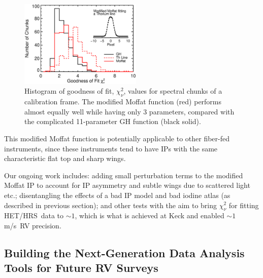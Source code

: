 \documentclass[12pt]{article}
\def\mps{m/s}
\def\hrs{HET/HRS}
\begin{document}
\begin{figure}
  \vspace{-35pt}
  \begin{center}
    \includegraphics[width=0.52\textwidth]{thar_vs_moffat}
  \end{center}
  \vspace{-25pt}  
  \caption{Histogram of goodness of fit, $\chi_\nu^2$, values for
    spectral chunks of a calibration frame. The modified Moffat
    function (red) performs almost equally well while having only 3
    parameters, compared with the complicated 11-parameter GH function
    (black solid).} 
  \vspace{-8pt}  
  \label{fig:ip}
\end{figure}


This modified Moffat function is potentially applicable to other
fiber-fed instruments, since these instruments tend to have IPs with
the same characteristic flat top and sharp wings.

Our ongoing work includes: adding small perturbation terms to the
modified Moffat IP to account for IP asymmetry and subtle wings due to
scattered light etc.; disentangling the effects of a bad IP model and
bad iodine atlas (as described in previous section); and other tests
with the aim to bring $\chi^2_\nu$ for fitting \hrs\ data to $\sim 1$,
which is what is achieved at Keck and enabled $\sim 1$ \mps\ RV
precision.



\vspace{-10pt}
\subsection{Building the Next-Generation Data Analysis Tools for Future RV Surveys}\label{sec:newrv}
\vspace{-5pt}
\end{document}
